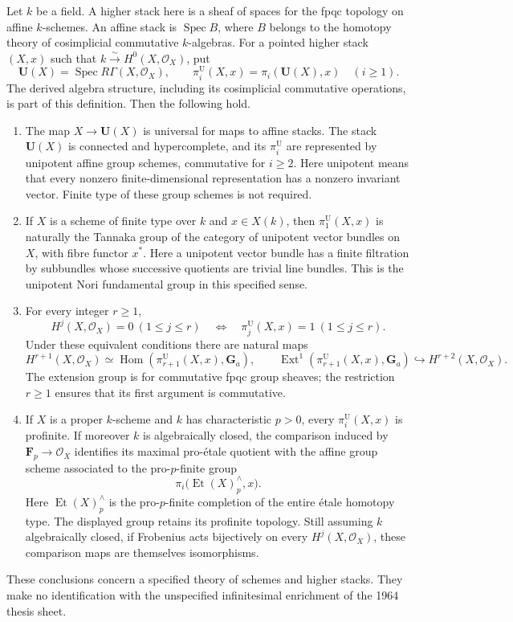 \begin{theorem}\label{B:unipotent-homotopy}
Let $k$ be a field. A higher stack here is a sheaf of spaces for the
fpqc topology on affine $k$-schemes. An affine stack is
$\operatorname{Spec}B$, where $B$ belongs to the homotopy theory of
cosimplicial commutative $k$-algebras. For a pointed higher stack $(X,x)$
such that $k\xrightarrow{\sim}H^0(X,\mathcal O_X)$, put
\[
 \mathbf U(X)=\operatorname{Spec}R\Gamma(X,\mathcal O_X),\qquad
 \pi_i^{\mathrm U}(X,x)=\pi_i(\mathbf U(X),x)\quad(i\ge1).
\]
The derived algebra structure, including its cosimplicial commutative
operations, is part of this definition. Then the following hold.
\begin{enumerate}
\item The map $X\to\mathbf U(X)$ is universal for maps to affine stacks.
The stack $\mathbf U(X)$ is connected and hypercomplete, and its
$\pi_i^{\mathrm U}$ are represented by unipotent affine group schemes,
commutative for $i\ge2$. Here unipotent means that every nonzero
finite-dimensional representation has a nonzero invariant vector.
Finite type of these group schemes is not required.
\item If $X$ is a scheme of finite type over $k$ and $x\in X(k)$, then
$\pi_1^{\mathrm U}(X,x)$ is naturally the Tannaka group of the category
of unipotent vector bundles on $X$, with fibre functor $x^*$.
Here a unipotent vector bundle has a finite filtration by subbundles
whose successive quotients are trivial line bundles. This is the
unipotent Nori fundamental group in this specified sense.
\item For every integer $r\ge1$,
\[
 H^j(X,\mathcal O_X)=0\ (1\le j\le r)
 \quad\Longleftrightarrow\quad
 \pi_j^{\mathrm U}(X,x)=1\ (1\le j\le r).
\]
Under these equivalent conditions there are natural maps
\[
 H^{r+1}(X,\mathcal O_X)
   \simeq\operatorname{Hom}(\pi_{r+1}^{\mathrm U}(X,x),\mathbf G_a),
 \qquad
 \operatorname{Ext}^1(\pi_{r+1}^{\mathrm U}(X,x),\mathbf G_a)
   \hookrightarrow H^{r+2}(X,\mathcal O_X).
\]
The extension group is for commutative fpqc group sheaves; the
restriction $r\ge1$ ensures that its first argument is commutative.
\item If $X$ is a proper $k$-scheme and $k$ has characteristic $p>0$, every
$\pi_i^{\mathrm U}(X,x)$ is profinite. If moreover $k$ is algebraically
closed, the comparison induced by $\mathbf F_p\to\mathcal O_X$ identifies
its maximal pro-\'etale quotient with the affine group scheme associated
to the pro-$p$-finite group
\[
 \pi_i\bigl(\operatorname{Et}(X)^{\wedge}_p,x\bigr).
\]
Here $\operatorname{Et}(X)^{\wedge}_p$ is the pro-$p$-finite completion
of the entire \'etale homotopy type. The displayed group retains its
profinite topology. Still assuming $k$ algebraically closed, if
Frobenius acts bijectively on every $H^j(X,\mathcal O_X)$, these
comparison maps are themselves isomorphisms.
\end{enumerate}
These conclusions concern a specified theory of schemes and higher stacks.
They make no identification with the unspecified infinitesimal enrichment
of the 1964 thesis sheet.
\end{theorem}
